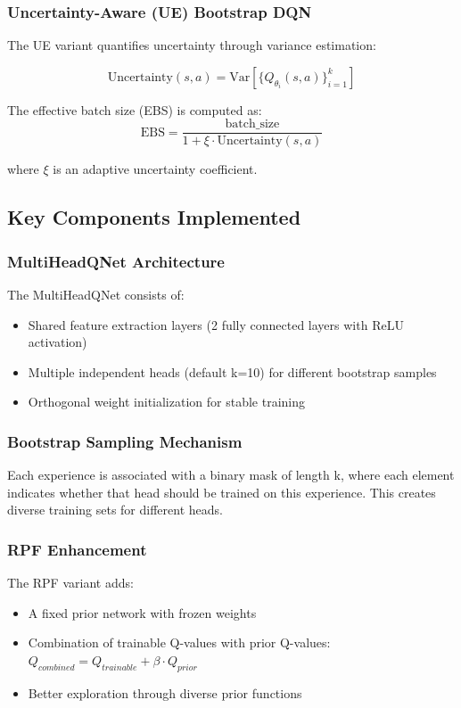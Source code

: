 \documentclass[12pt]{article}
\begin{document}
{{{\subsubsection{Uncertainty-Aware (UE) Bootstrap DQN}
The UE variant quantifies uncertainty through variance estimation:

\begin{equation}
\text{Uncertainty}(s,a) = \text{Var}\left[\{Q_{\theta_i}(s,a)\}_{i=1}^k\right]
\end{equation}

The effective batch size (EBS) is computed as:
\begin{equation}
\text{EBS} = \frac{\text{batch\_size}}{1 + \xi \cdot \text{Uncertainty}(s,a)}
\end{equation}

where $\xi$ is an adaptive uncertainty coefficient.

\subsection{Key Components Implemented}

\subsubsection{MultiHeadQNet Architecture}
The MultiHeadQNet consists of:
\begin{itemize}
    \item Shared feature extraction layers (2 fully connected layers with ReLU activation)
    \item Multiple independent heads (default k=10) for different bootstrap samples
    \item Orthogonal weight initialization for stable training
\end{itemize}

\subsubsection{Bootstrap Sampling Mechanism}
Each experience is associated with a binary mask of length k, where each element indicates whether that head should be trained on this experience. This creates diverse training sets for different heads.

\subsubsection{RPF Enhancement}
The RPF variant adds:
\begin{itemize}
    \item A fixed prior network with frozen weights
    \item Combination of trainable Q-values with prior Q-values: $Q_{combined} = Q_{trainable} + \beta \cdot Q_{prior}$
    \item Better exploration through diverse prior functions
\end{itemize}

}}}
\end{document}
